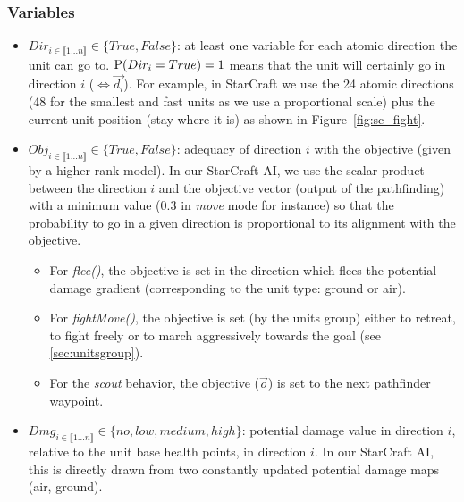 \subsubsection{Variables}
\begin{itemize}
\item $Dir_{i \in \llbracket 1 \dots n\rrbracket } \in \{True, False\}$: at least one variable for each atomic direction the unit can go to. $\mathrm{P}(Dir_i = True) = 1$ means that the unit will certainly go in direction $i$ ($\Leftrightarrow \vec{d_i}$). For example, in StarCraft we use the 24 atomic directions (48 for the smallest and fast units as we use a proportional scale) plus the current unit position (stay where it is) as shown in Figure~\ref{fig:sc_fight}. %

\item $Obj_{i \in \llbracket 1 \dots n\rrbracket } \in \{True, False\}$: adequacy of direction $i$ with the objective (given by a higher rank model). In our StarCraft AI, we use the scalar product between the direction $i$ and the objective vector (output of the pathfinding) with a minimum value ($0.3$ in \textit{move} mode for instance) so that the probability to go in a given direction is proportional to its alignment with the objective.
\begin{itemize}
    \item For \textit{flee()}, the objective is set in the direction which flees the potential damage gradient (corresponding to the unit type: ground or air).
    \item For \textit{fightMove()}, the objective is set (by the units group) either to retreat, to fight freely or to march aggressively towards the goal (see \ref{sec:unitsgroup}).
    \item For the \textit{scout} behavior, the objective ($\vec{o}$) is set to the next pathfinder waypoint.
\end{itemize}

\item $Dmg_{i \in \llbracket 1 \dots n\rrbracket } \in \{no, low, medium, high\}$: potential damage value in direction $i$, relative to the unit base health points, in direction $i$. In our StarCraft AI, this is directly drawn from two constantly updated potential damage maps (air, ground). %


\end{itemize}
